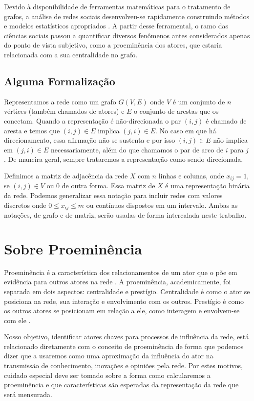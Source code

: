 \documentclass{article}
\begin{document}
Devido à disponibilidade de ferramentas matemáticas para o tratamento de grafos,
a análise de redes sociais desenvolveu-se rapidamente construindo métodos e
modelos estatísticos apropriados \cite{Butts2009}. A partir desse ferramental, o
ramo das ciências sociais passou a quantificar diversos fenômenos antes
considerados apenas do ponto de vista subjetivo, como a proeminência dos atores,
que estaria relacionada com a sua centralidade no grafo.

\subsection{Alguma Formalização}

Representamos a rede como um grafo $G(V,E)$ onde $V$ é um conjunto de $n$
vértices (também chamados de atores) e $E$ o conjunto de arestas que os conectam.
Quando a representação é não-direcionada o par $(i,j)$ é chamado de aresta e
temos que $(i,j) \in E$ implica $(j,i) \in E$. No caso em que há direcionamento,
essa afirmação não se sustenta e por isso $(i,j) \in E$ não implica em $(j,i) \in
E$ necessariamente, além do que chamamos o par de arco de $i$ para $j$. De
maneira geral, sempre trataremos a representação como sendo direcionada.

Definimos a matriz de adjacência da rede $X$ com $n$ linhas e colunas, onde
$x_{ij} = 1$, se $(i,j) \in V$ ou 0 de outra forma. Essa matriz de $X$ é uma
representação binária da rede. Podemos generalizar essa notação para incluir
redes com valores discretos onde $0 \leq x_{ij} \leq m$ ou contínuos dispostos em
um intervalo. Ambas as notações, de grafo e de matriz, serão usadas de forma
intercalada neste trabalho.

\section{Sobre Proeminência}

Proeminência é a característica dos relacionamentos de um ator que o põe em
evidência para outros atores na rede \cite{Wasserman}. A proeminência,
academicamente, foi separada em dois aspectos: centralidade e prestígio.
Centralidade é como o ator se posiciona na rede, sua interação e envolvimento com
os outros. Prestígio é como os outros atores se posicionam em relação a ele, como
interagem e envolvem-se com ele \cite{Knoke1983}.

Nosso objetivo, identificar atores chaves para processos de influência da rede,
está relacionado diretamente com o conceito de proeminência de forma que podemos
dizer que a usaremos como uma aproximação da influência do ator na transmissão de
conhecimento, inovações e opiniões pela rede. Por estes motivos, cuidado especial
deve ser tomado sobre a forma como calcularemos a proeminência e que
características são esperadas da representação da rede que será mensurada.
\end{document}
